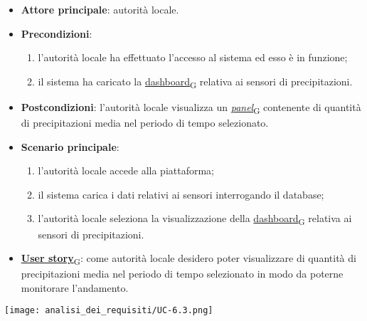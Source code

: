 \begin{itemize}
	\item \textbf{Attore principale}: autorità locale.
	\item \textbf{Precondizioni}:
	      \begin{enumerate}
		      \item l'autorità locale ha effettuato l'accesso al sistema ed esso è in funzione;
		      \item il sistema ha caricato la \href{https://7last.github.io/docs/rtb/documentazione-interna/glossario\#dashboard}{dashboard\textsubscript{G}} relativa ai sensori di precipitazioni.
	      \end{enumerate}
	\item \textbf{Postcondizioni}: l'autorità locale visualizza un \href{https://7last.github.io/docs/rtb/documentazione-interna/glossario\#panel}{\textit{panel}\textsubscript{G}} contenente di quantità di precipitazioni media nel periodo di tempo selezionato.
	\item \textbf{Scenario principale}:
	      \begin{enumerate}
		      \item l'autorità locale accede alla piattaforma;
		      \item il sistema carica i dati relativi ai sensori interrogando il database;
		      \item l'autorità locale seleziona la visualizzazione della \href{https://7last.github.io/docs/rtb/documentazione-interna/glossario\#dashboard}{dashboard\textsubscript{G}} relativa ai sensori di precipitazioni.
	      \end{enumerate}
	\item \href{https://7last.github.io/docs/rtb/documentazione-interna/glossario\#user-story}{\textbf{User story}\textsubscript{G}}: come autorità locale desidero poter visualizzare di quantità di precipitazioni media nel periodo di tempo selezionato
	      in modo da poterne monitorare l'andamento.
\end{itemize}
\begin{center}
	\texttt{[image: analisi\_dei\_requisiti/UC-6.3.png]}
\end{center}

